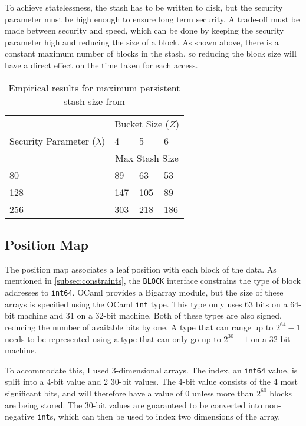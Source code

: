 \documentclass[12pt,a4paper,twoside,openright]{report}
\begin{document}
To achieve statelessness, the stash has to be written to disk, but the security parameter must be high enough to ensure long term security. A trade-off must be made between security and speed, which can be done by keeping the security parameter high and reducing the size of a block. As shown above, there is a constant maximum number of blocks in the stash, so reducing the block size will have a direct effect on the time taken for each access.

\begin{table}
\centering
\begin{tabular}{|l|l|l|l|}
	\hline
	& \multicolumn{3}{c|}{Bucket Size ($Z$)} \\
	\cline{2-4}
	Security Parameter ($\lambda$) & 4 & 5 & 6 \\
	\cline{2-4}
	& \multicolumn{3}{c|}{Max Stash Size} \\
	\hline
	80 & 89 & 63 & 53 \\
	\hline
	128 & 147 & 105 & 89 \\
	\hline
	256 & 303 & 218 & 186 \\
	\hline
\end{tabular}
\caption{Empirical results for maximum persistent stash size from \citet{stefanov2013path}}
\label{tab:stashsizes}
\end{table}

\subsection{Position Map}

The position map associates a leaf position with each block of the data. As mentioned in \cref{subsec:constraints}, the \texttt{BLOCK} interface constrains the type of block addresses to \texttt{int64}. OCaml provides a Bigarray module, but the size of these arrays is specified using the OCaml \texttt{int} type. This type only uses 63 bits on a 64-bit machine and 31 on a 32-bit machine. Both of these types are also signed, reducing the number of available bits by one. A type that can range up to $2^{64} - 1$ needs to be represented using a type that can only go up to $2^{30} - 1$ on a 32-bit machine.

To accommodate this, I used 3-dimensional arrays. The index, an \texttt{int64} value, is split into a 4-bit value and 2 30-bit values. The 4-bit value consists of the 4 most significant bits, and will therefore have a value of 0 unless more than $2^{60}$ blocks are being stored. The 30-bit values are guaranteed to be converted into non-negative \texttt{int}s, which can then be used to index two dimensions of the array.
\end{document}
